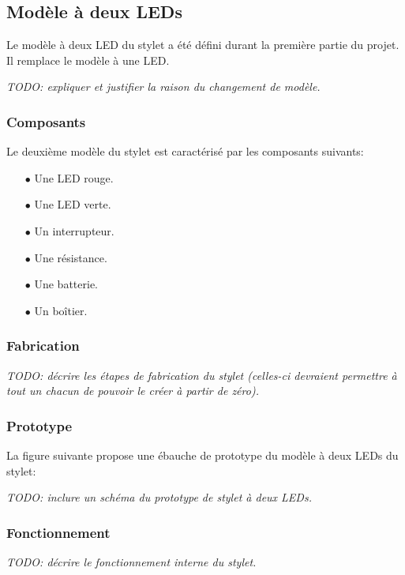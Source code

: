 \documentclass[11pt,a4paper,oldfontcommands]{memoir}
\begin{document}
\subsection{Modèle à deux LEDs}

Le modèle à deux LED du stylet a été défini durant la première partie du projet. Il remplace le modèle à une LED.

\textit{TODO: expliquer et justifier la raison du changement de modèle.}

\subsubsection{Composants}

Le deuxième modèle du stylet est caractérisé par les composants suivants:

\begin{itemize}
\item[$\bullet$] Une LED rouge.
\item[$\bullet$] Une LED verte.
\item[$\bullet$] Un interrupteur.
\item[$\bullet$] Une résistance.
\item[$\bullet$] Une batterie.
\item[$\bullet$] Un boîtier.
\end{itemize}

\subsubsection{Fabrication}

\textit{TODO: décrire les étapes de fabrication du stylet (celles-ci devraient permettre à tout un chacun de pouvoir le créer à partir de zéro).}

\subsubsection{Prototype}

La figure suivante propose une ébauche de prototype du modèle à deux LEDs du stylet:

\textit{TODO: inclure un schéma du prototype de stylet à deux LEDs.}

\subsubsection{Fonctionnement}

\textit{TODO: décrire le fonctionnement interne du stylet.}
\end{document}
